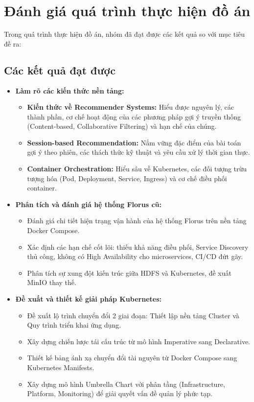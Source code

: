 \section{Đánh giá quá trình thực hiện đồ án}

Trong quá trình thực hiện đồ án, nhóm đã đạt được các kết quả so với mục tiêu đề ra:

\subsection{Các kết quả đạt được}

\begin{itemize}

    \item \textbf{Làm rõ các kiến thức nền tảng:}
    \begin{itemize}
        \item \textbf{Kiến thức về Recommender Systems:} Hiểu được nguyên lý, các thành phần, cơ chế hoạt động của các phương pháp gợi ý truyền thống (Content-based, Collaborative Filtering) và hạn chế của chúng.
        \item \textbf{Session-based Recommendation:} Nắm vững đặc điểm của bài toán gợi ý theo phiên, các thách thức kỹ thuật và yêu cầu xử lý thời gian thực.
        \item \textbf{Container Orchestration:} Hiểu sâu về Kubernetes, các đối tượng trừu tượng hóa (Pod, Deployment, Service, Ingress) và cơ chế điều phối container.
    \end{itemize}

    \item \textbf{Phân tích và đánh giá hệ thống Florus cũ:}
    \begin{itemize}
        \item Đánh giá chi tiết hiện trạng vận hành của hệ thống Florus trên nền tảng Docker Compose.
        \item Xác định các hạn chế cốt lõi: thiếu khả năng điều phối, Service Discovery thủ công, không có High Availability cho microservices, CI/CD đứt gãy.
        \item Phân tích sự xung đột kiến trúc giữa HDFS và Kubernetes, đề xuất MinIO thay thế.
    \end{itemize}

    \item \textbf{Đề xuất và thiết kế giải pháp Kubernetes:}
    \begin{itemize}
        \item Đề xuất lộ trình chuyển đổi 2 giai đoạn: Thiết lập nền tảng Cluster và Quy trình triển khai ứng dụng.
        \item Xây dựng chiến lược tái cấu trúc từ mô hình Imperative sang Declarative.
        \item Thiết kế bảng ánh xạ chuyển đổi tài nguyên từ Docker Compose sang Kubernetes Manifests.
        \item Xây dựng mô hình Umbrella Chart với phân tầng (Infrastructure, Platform, Monitoring) để giải quyết vấn đề quản lý phức tạp.
    \end{itemize}


\end{itemize}
